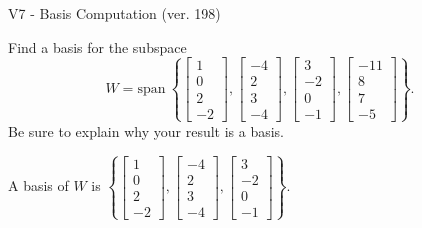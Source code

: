 \begin{exercise}
  \begin{exerciseTitle}V7 - Basis Computation (ver. 198)\end{exerciseTitle}
  \begin{exerciseStatement}
    Find a basis for the subspace 
\[W=\mathrm{span}\ \left\{\left[\begin{array}{r}
1 \\
0 \\
2 \\
-2
\end{array}\right] , \left[\begin{array}{r}
-4 \\
2 \\
3 \\
-4
\end{array}\right] , \left[\begin{array}{r}
3 \\
-2 \\
0 \\
-1
\end{array}\right] , \left[\begin{array}{r}
-11 \\
8 \\
7 \\
-5
\end{array}\right]\right\}.\]
 Be sure to explain why your result is a basis.


  \end{exerciseStatement}
  \begin{exerciseAnswer}
   A basis of \(W\) is  \(\left\{\left[\begin{array}{r}
1 \\
0 \\
2 \\
-2
\end{array}\right] , \left[\begin{array}{r}
-4 \\
2 \\
3 \\
-4
\end{array}\right] , \left[\begin{array}{r}
3 \\
-2 \\
0 \\
-1
\end{array}\right]\right\}\).
  


  \end{exerciseAnswer}
\end{exercise}